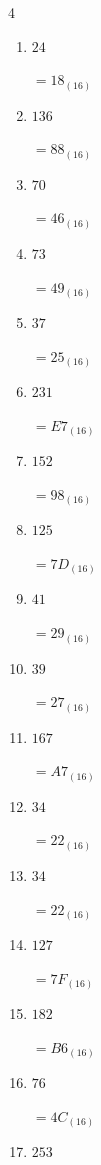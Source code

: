 \begin{multicols}{4}
\begin{enumerate}
  \item $24$

        $=18_{(16)}$

  \item $136$

        $=88_{(16)}$

  \item $70$

        $=46_{(16)}$

  \item $73$

        $=49_{(16)}$

  \item $37$

        $=25_{(16)}$

  \item $231$

        $=E7_{(16)}$

  \item $152$

        $=98_{(16)}$

  \item $125$

        $=7D_{(16)}$

  \item $41$

        $=29_{(16)}$

\columnbreak %

  \item $39$

        $=27_{(16)}$

  \item $167$

        $=A7_{(16)}$

  \item $34$

        $=22_{(16)}$

  \item $34$

        $=22_{(16)}$

  \item $127$

        $=7F_{(16)}$

  \item $182$

        $=B6_{(16)}$

  \item $76$

        $=4C_{(16)}$

  \item $253$


\end{enumerate}
\end{multicols}
